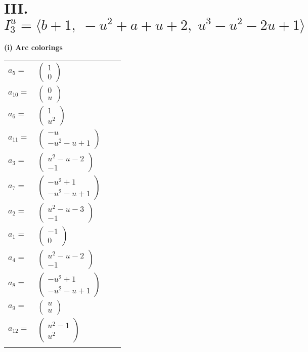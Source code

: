 \documentclass[1p]{elsarticle_modified}
\theoremstyle{definition}
\begin{document}
\centering \section*{III. $I^u_{3}= \langle b+1,\;- u^2+a+u+2,\;u^3- u^2-2 u+1 \rangle$}
\flushleft \textbf{(i) Arc colorings}\\
\begin{tabular}{m{7pt} m{180pt} m{7pt} m{180pt} }
\flushright $a_{5}=$&$\begin{pmatrix}1\\0\end{pmatrix}$ \\
\flushright $a_{10}=$&$\begin{pmatrix}0\\u\end{pmatrix}$ \\
\flushright $a_{6}=$&$\begin{pmatrix}1\\u^2\end{pmatrix}$ \\
\flushright $a_{11}=$&$\begin{pmatrix}- u\\- u^2- u+1\end{pmatrix}$ \\
\flushright $a_{3}=$&$\begin{pmatrix}u^2- u-2\\-1\end{pmatrix}$ \\
\flushright $a_{7}=$&$\begin{pmatrix}- u^2+1\\- u^2- u+1\end{pmatrix}$ \\
\flushright $a_{2}=$&$\begin{pmatrix}u^2- u-3\\-1\end{pmatrix}$ \\
\flushright $a_{1}=$&$\begin{pmatrix}-1\\0\end{pmatrix}$ \\
\flushright $a_{4}=$&$\begin{pmatrix}u^2- u-2\\-1\end{pmatrix}$ \\
\flushright $a_{8}=$&$\begin{pmatrix}- u^2+1\\- u^2- u+1\end{pmatrix}$ \\
\flushright $a_{9}=$&$\begin{pmatrix}u\\u\end{pmatrix}$ \\
\flushright $a_{12}=$&$\begin{pmatrix}u^2-1\\u^2\end{pmatrix}$\\&\end{tabular}
\end{document}
